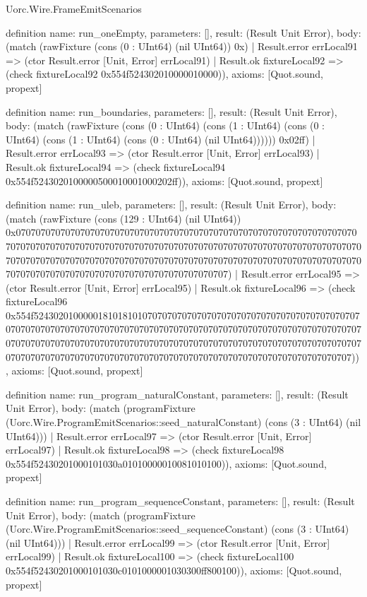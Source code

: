 \begin{lexlean}{Uorc.Wire.FrameEmitScenarios}
\begin{semanticmodule}
definition{
  name: run_oneEmpty,
  parameters: [],
  result: (Result Unit Error),
  body: (match (rawFixture (cons (0 : UInt64) (nil UInt64)) 0x)
    | Result.error errLocal91 => (ctor Result.error [Unit, Error] errLocal91)
    | Result.ok fixtureLocal92 => (check fixtureLocal92 0x554f524302010000010000)),
  axioms: [Quot.sound, propext]
}

definition{
  name: run_boundaries,
  parameters: [],
  result: (Result Unit Error),
  body: (match (rawFixture (cons (0 : UInt64) (cons (1 : UInt64) (cons (0 : UInt64) (cons (1 : UInt64) (cons (0 : UInt64) (nil UInt64)))))) 0x02ff)
    | Result.error errLocal93 => (ctor Result.error [Unit, Error] errLocal93)
    | Result.ok fixtureLocal94 => (check fixtureLocal94 0x554f5243020100000500010001000202ff)),
  axioms: [Quot.sound, propext]
}

definition{
  name: run_uleb,
  parameters: [],
  result: (Result Unit Error),
  body: (match (rawFixture (cons (129 : UInt64) (nil UInt64)) 0x070707070707070707070707070707070707070707070707070707070707070707070707070707070707070707070707070707070707070707070707070707070707070707070707070707070707070707070707070707070707070707070707070707070707070707070707070707070707070707070707070707070707070707)
    | Result.error errLocal95 => (ctor Result.error [Unit, Error] errLocal95)
    | Result.ok fixtureLocal96 => (check fixtureLocal96 0x554f5243020100000181018101070707070707070707070707070707070707070707070707070707070707070707070707070707070707070707070707070707070707070707070707070707070707070707070707070707070707070707070707070707070707070707070707070707070707070707070707070707070707070707070707070707070707070707)),
  axioms: [Quot.sound, propext]
}

definition{
  name: run_program_naturalConstant,
  parameters: [],
  result: (Result Unit Error),
  body: (match (programFixture (Uorc.Wire.ProgramEmitScenarios::seed_naturalConstant) (cons (3 : UInt64) (nil UInt64)))
    | Result.error errLocal97 => (ctor Result.error [Unit, Error] errLocal97)
    | Result.ok fixtureLocal98 => (check fixtureLocal98 0x554f52430201000101030a01010000010081010100)),
  axioms: [Quot.sound, propext]
}

definition{
  name: run_program_sequenceConstant,
  parameters: [],
  result: (Result Unit Error),
  body: (match (programFixture (Uorc.Wire.ProgramEmitScenarios::seed_sequenceConstant) (cons (3 : UInt64) (nil UInt64)))
    | Result.error errLocal99 => (ctor Result.error [Unit, Error] errLocal99)
    | Result.ok fixtureLocal100 => (check fixtureLocal100 0x554f52430201000101030c0101000001030300ff800100)),
  axioms: [Quot.sound, propext]
}


\end{semanticmodule}
\end{lexlean}
